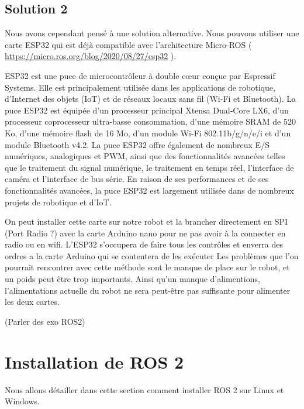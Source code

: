 			\subsection{Solution 2}

Nous avons cependant pensé à une solution alternative. Nous pouvons utiliser une carte ESP32 qui est déjà compatible 
avec l’architecture Micro-ROS ( \url{https://micro.ros.org/blog/2020/08/27/esp32} ).  
\linebreak

ESP32 est une puce de microcontrôleur à double cœur conçue par Espressif Systems. Elle est principalement utilisée 
dans les applications de robotique, d'Internet des objets (IoT) et de réseaux locaux sans fil (Wi-Fi et Bluetooth). 
La puce ESP32 est équipée d'un processeur principal Xtensa Dual-Core LX6, d'un processeur coprocesseur ultra-basse consommation, 
d'une mémoire SRAM de 520 Ko, d'une mémoire flash de 16 Mo, d'un module Wi-Fi 802.11b/g/n/e/i et d'un module Bluetooth v4.2. 
La puce ESP32 offre également de nombreux E/S numériques, analogiques et PWM, ainsi que des fonctionnalités avancées telles 
que le traitement du signal numérique, le traitement en temps réel, l'interface de caméra et l'interface de bus série. 
En raison de ses performances et de ses fonctionnalités avancées, la puce ESP32 est largement utilisée dans de nombreux projets de 
robotique et d'IoT.
\linebreak
	
On peut installer cette carte sur notre robot et la brancher directement en SPI (Port Radio ?) avec la carte Arduino nano pour 
ne pas avoir à la connecter en radio ou en wifi.  
L’ESP32 s’occupera de faire tous les contrôles et enverra des ordres a la carte Arduino qui se contentera de les exécuter 
Les problèmes que l’on pourrait rencontrer avec cette méthode sont le manque de place sur le robot, et un poids peut être trop importants. 
Ainsi qu’un manque d’alimentions, l’alimentations actuelle du robot ne sera peut-être pas suffisante pour alimenter les deux cartes. 
\linebreak
	
(Parler des exo ROS2) 

		\section{Installation de ROS 2}

Nous allons détailler dans cette section comment installer ROS 2 sur Linux et Windows.
\linebreak

